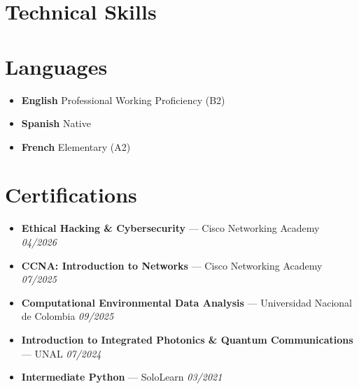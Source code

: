 \documentclass[11pt,a4paper]{article}
\begin{document}
\section{Technical Skills}
\begin{tcolorbox}[colback=lightgray, colframe=lightgray, boxrule=0pt, arc=6pt, left=10pt, right=10pt, top=10pt, bottom=10pt]
\noindent
\linespread{1.8}\selectfont
{}
\end{tcolorbox}

\section{Languages}
\begin{itemize}[label={}, leftmargin=0.3cm, itemsep=6pt]
    \item \textbf{English} \hfill Professional Working Proficiency (B2) \quad \textcolor{accent}{\faCircle \faCircle \faCircle \faCircle} \textcolor{bulletline}{\faCircle}
    \item \textbf{Spanish} \hfill Native \quad \textcolor{accent}{\faCircle \faCircle \faCircle \faCircle \faCircle}
    \item \textbf{French} \hfill Elementary (A2) \quad \textcolor{accent}{\faCircle \faCircle} \textcolor{bulletline}{\faCircle \faCircle \faCircle}
\end{itemize}

\section{Certifications}
\begin{itemize}[label={\color{accentblue}\faAward}, leftmargin=0.6cm, itemsep=6pt]
    \item \textbf{Ethical Hacking \& Cybersecurity} --- Cisco Networking Academy \hfill \textit{04/2026}
    \item \textbf{CCNA: Introduction to Networks} --- Cisco Networking Academy \hfill \textit{07/2025}
    \item \textbf{Computational Environmental Data Analysis} --- Universidad Nacional de Colombia \hfill \textit{09/2025}
    \item \textbf{Introduction to Integrated Photonics \& Quantum Communications} --- UNAL \hfill \textit{07/2024}
    \item \textbf{Intermediate Python} --- SoloLearn \hfill \textit{03/2021}
\end{itemize}
\end{document}
